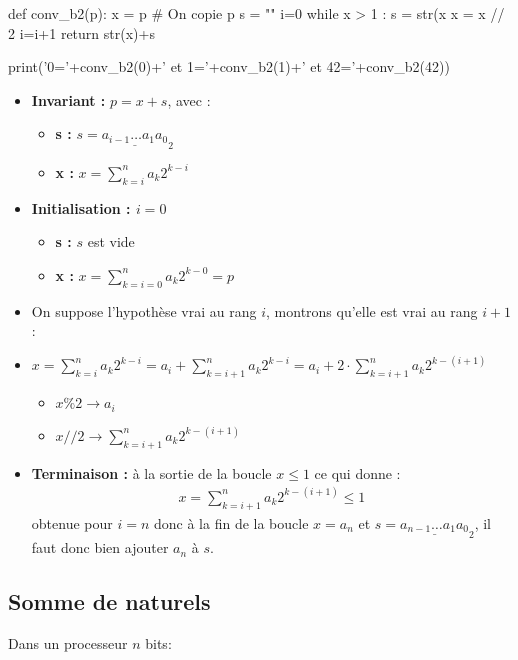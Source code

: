 \begin{pycode}
def conv_b2(p):
    x = p # On copie p
    s = ""
    i=0
    while x > 1 : 
        s = str(x%
        x = x // 2
        i=i+1
    return str(x)+s

print('0='+conv_b2(0)+' et 1='+conv_b2(1)+' et 42='+conv_b2(42))
\end{pycode}
\begin{itemize}
\item \textbf{Invariant : } $p=x+s$, avec : 
\begin{itemize}
\item \textbf{s : } $s=\underline{a_{i-1}\dots a_1a_0}_2$
\item \textbf{x : } $x=\displaystyle{\sum_{k=i}^n a_k2^{k-i}}$
\end{itemize}
\item \textbf{Initialisation : $i=0$}
\begin{itemize}
\item \textbf{s : } $s$ est vide
\item \textbf{x : } $x=\displaystyle{\sum_{k=i=0}^n a_k2^{k-0}=p}$
\end{itemize}
\item On suppose l'hypothèse vrai au rang $i$, montrons qu'elle est vrai au rang $i+1$ : 
\item $x=\displaystyle{\sum_{k=i}^n a_k2^{k-i}=a_i+\sum_{k=i+1}^n a_k2^{k-i}=a_i+2\cdot \sum_{k=i+1}^n a_k2^{k-(i+1)}}$
\begin{itemize}
\item $x\%2\rightarrow a_i$
\item $x//2\rightarrow \displaystyle{\sum_{k=i+1}^n a_k2^{k-(i+1)}}$
\end{itemize}
\item \textbf{Terminaison : }
à la sortie de la boucle $x\leq 1$ ce qui donne :
\begin{align*}
x=\displaystyle{\sum_{k=i+1}^n a_k2^{k-(i+1)}}\leq 1
\end{align*}
obtenue pour $i=n$ donc à la fin de la boucle $x=a_n$ et $s=\underline{a_{n-1}\dots a_1a_0}_2$, il faut donc bien ajouter $a_n$ à $s$.
\end{itemize}

\subsection*{Somme de naturels}
\sloppy

Dans un processeur $n$ bits:

